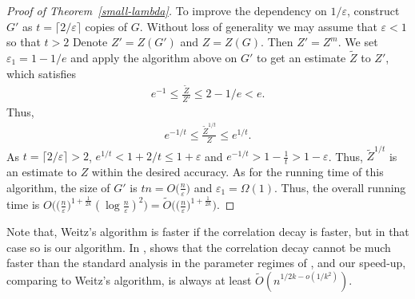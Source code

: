 \documentclass[10pt,a4paper]{article}
\newtheorem{lemma}{Lemma}[section]
\newcommand{\ceil}[1]{\lceil#1\rceil}
\newcommand{\eps}{\varepsilon}
\begin{document}
\begin{proof}[Proof of Theorem~\ref{small-lambda}]
  To improve the dependency on $1/\eps$,
  construct $G'$ as $t=\ceil{2/\eps}$ copies of $G$.
  Without loss of generality we may assume that $\eps<1$ so that $t>2$
  Denote $Z'=Z(G')$ and $Z=Z(G)$.
  Then $Z'=Z^m$.
  We set $\eps_1=1-1/e$ and apply the algorithm above on $G'$ to get an estimate $\widetilde{Z}$ to $Z'$,
  which satisfies
  \begin{align*}
    e^{-1}\le\frac{\widetilde{Z}}{Z'}\le 2-1/e < e.
  \end{align*}
  Thus,
  \begin{align*}
    e^{-1/t}\le \frac{\widetilde{Z}^{1/t}}{Z} \le e^{1/t}.
  \end{align*}
  As $t=\ceil{2/\eps}>2$, $e^{1/t}<1+2/t\le 1+ \eps$ and $e^{-1/t} > 1-\frac{1}{t}>1-\eps$. 
  Thus, $\widetilde{Z}^{1/t}$ is an estimate to $Z$ within the desired accuracy.
  As for the running time of this algorithm, 
  the size of $G'$ is $t n=O\big(\frac{n}{\eps}\big)$ and $\eps_1=\Omega(1)$.
  Thus, the overall running time is $O\big( \big( \frac{n}{\eps} \big)^{1+\frac{1}{2k}}(\log \frac{n}{\eps})^2 \big)=\widetilde{O}\big( \big( \frac{n}{\eps} \big)^{1+\frac{1}{2k}} \big)$.
\end{proof}

Note that, Weitz's algorithm is faster if the correlation decay is faster,
but in that case so is our algorithm.
In ,
 shows that the correlation decay cannot be much faster than the standard analysis in the parameter regimes of ,
and our speed-up, comparing to Weitz's algorithm, is always at least $\widetilde{O}(n^{1/2k-o(1/k^2)})$.

%
%
\end{document}
